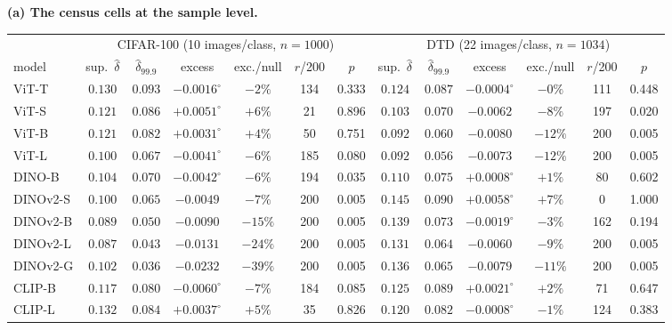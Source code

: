 \begin{table}[H]
\centering
\scriptsize
\setlength{\tabcolsep}{2.4pt}
\noindent\textbf{(a) The census cells at the sample level.}\par\vspace{1.5pt}
\begin{tabular}{lcccccc|cccccc}
\toprule
& \multicolumn{6}{c|}{CIFAR-100 (10 images/class, $n{=}1000$)} & \multicolumn{6}{c}{DTD (22 images/class, $n{=}1034$)} \\
model & sup.\ $\hat\delta$ & $\hat\delta_{99.9}$ & excess & exc./null & $r$/200 & $p$ & sup.\ $\hat\delta$ & $\hat\delta_{99.9}$ & excess & exc./null & $r$/200 & $p$ \\
\midrule
ViT-T & $0.130$ & $0.093$ & $-0.0016^{\circ}$ & $-2\%$ & 134 & 0.333 & $0.124$ & $0.087$ & $-0.0004^{\circ}$ & $-0\%$ & 111 & 0.448 \\
ViT-S & $0.121$ & $0.086$ & $+0.0051^{\circ}$ & $+6\%$ & 21 & 0.896 & $0.103$ & $0.070$ & $-0.0062$ & $-8\%$ & 197 & 0.020 \\
ViT-B & $0.121$ & $0.082$ & $+0.0031^{\circ}$ & $+4\%$ & 50 & 0.751 & $0.092$ & $0.060$ & $-0.0080$ & $-12\%$ & 200 & 0.005 \\
ViT-L & $0.100$ & $0.067$ & $-0.0041^{\circ}$ & $-6\%$ & 185 & 0.080 & $0.092$ & $0.056$ & $-0.0073$ & $-12\%$ & 200 & 0.005 \\
\midrule
DINO-B & $0.104$ & $0.070$ & $-0.0042^{\circ}$ & $-6\%$ & 194 & 0.035 & $0.110$ & $0.075$ & $+0.0008^{\circ}$ & $+1\%$ & 80 & 0.602 \\
DINOv2-S & $0.100$ & $0.065$ & $-0.0049$ & $-7\%$ & 200 & 0.005 & $0.145$ & $0.090$ & $+0.0058^{\circ}$ & $+7\%$ & 0 & 1.000 \\
DINOv2-B & $0.089$ & $0.050$ & $-0.0090$ & $-15\%$ & 200 & 0.005 & $0.139$ & $0.073$ & $-0.0019^{\circ}$ & $-3\%$ & 162 & 0.194 \\
DINOv2-L & $0.087$ & $0.043$ & $-0.0131$ & $-24\%$ & 200 & 0.005 & $0.131$ & $0.064$ & $-0.0060$ & $-9\%$ & 200 & 0.005 \\
DINOv2-G & $0.102$ & $0.036$ & $-0.0232$ & $-39\%$ & 200 & 0.005 & $0.136$ & $0.065$ & $-0.0079$ & $-11\%$ & 200 & 0.005 \\
\midrule
CLIP-B & $0.117$ & $0.080$ & $-0.0060^{\circ}$ & $-7\%$ & 184 & 0.085 & $0.125$ & $0.089$ & $+0.0021^{\circ}$ & $+2\%$ & 71 & 0.647 \\
CLIP-L & $0.132$ & $0.084$ & $+0.0037^{\circ}$ & $+5\%$ & 35 & 0.826 & $0.120$ & $0.082$ & $-0.0008^{\circ}$ & $-1\%$ & 124 & 0.383 \\

\end{tabular}
\end{table}
